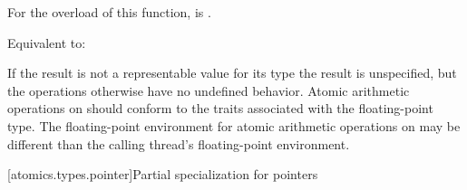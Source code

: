\begin{itemdescr}
\pnum
\constraints
For the  overload of this function,
 is .

\pnum
\effects
Equivalent to: 

\pnum
\remarks
If the result is not a representable value for its type
the result is unspecified, but the operations otherwise have no undefined
behavior. Atomic arithmetic operations on 
should conform to the 
traits associated with the floating-point type.
The floating-point environment for atomic arithmetic operations
on  may be different than the
calling thread's floating-point environment.
\end{itemdescr}

[atomics.types.pointer]{Partial specialization for pointers}
%

